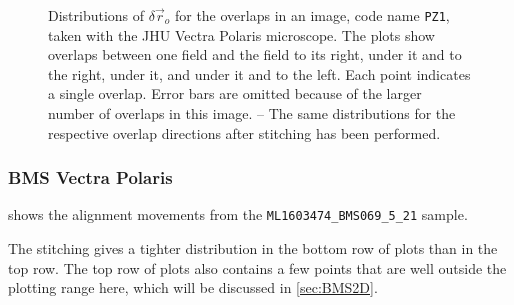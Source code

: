 \documentclass{article}
\begin{document}
\begin{figure}[ht]
\begin{subfigure}{0.24\linewidth}
		\caption{}
		\label{fig:stitchresultJHUPolaris1}
	\end{subfigure}
	\caption{Distributions of $\delta\vec{r}_o$ for the overlaps in an image, code name \texttt{PZ1}, taken with the JHU Vectra Polaris microscope.  The plots show overlaps between one field and the field  to its right,  under it and to the right,  under it, and  under it and to the left.  Each point indicates a single overlap.  Error bars are omitted because of the larger number of overlaps in this image.  -- The same distributions for the respective overlap directions after stitching has been performed.}
	\label{fig:alignmentresultsJHUPolaris}
\end{figure}

\subsubsection{BMS Vectra Polaris}

 shows the alignment movements from the \texttt{ML1603474\_BMS069\_5\_21} sample.

The stitching gives a tighter distribution in the bottom row of plots than in the top row.  The top row of plots also contains a few points that are well outside the plotting range here, which will be discussed in \cref{sec:BMS2D}.  
\end{document}

